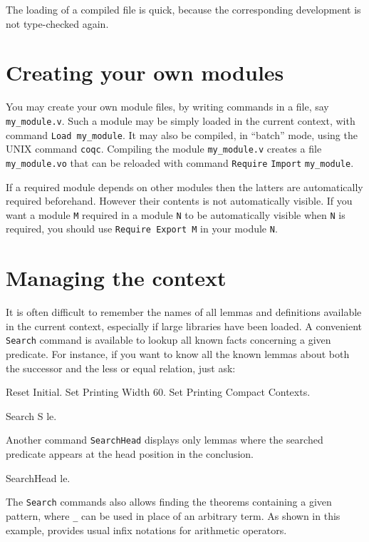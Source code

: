 \documentclass[11pt,a4paper]{book}
\begin{document}
The loading of a compiled file is quick, because the corresponding
development is not type-checked again.

\section{Creating your own modules}

You may create your own module files, by writing {\Coq} commands in a file,
say \verb:my_module.v:. Such a module may be simply loaded in the current
context, with command \verb:Load my_module:. It may also be compiled,
in ``batch'' mode, using the UNIX command
\verb:coqc:. Compiling the module \verb:my_module.v: creates a
file \verb:my_module.vo:{} that can be reloaded with command
\verb:Require: \verb:Import: \verb:my_module:.

If a required module depends on other modules then the latters are
automatically required beforehand. However their contents is not
automatically visible.  If you want a module \verb=M= required in a
module \verb=N= to be automatically visible when \verb=N= is required,
you should use \verb:Require Export M: in your module \verb:N:.

\section{Managing the context}

It is often difficult to remember the names of all lemmas and
definitions available in the current context, especially if large
libraries have been loaded. A convenient \verb:Search: command
is available to lookup all known facts
concerning a given predicate. For instance, if you want to know all the
known lemmas about both the successor and the less or equal relation, just ask:
\begin{coq_eval}
Reset Initial.
Set Printing Width 60.
Set Printing Compact Contexts.
\end{coq_eval}
\begin{coq_example}
Search S le.
\end{coq_example}
Another command \verb:SearchHead: displays only lemmas where the searched
predicate appears at the head position in the conclusion.
\begin{coq_example}
SearchHead le.
\end{coq_example}

The \verb:Search: commands also allows finding the theorems
containing a given pattern, where \verb:_: can be used in
place of an arbitrary term. As shown in this example, \Coq{}
provides usual infix notations for arithmetic operators.
\end{document}
